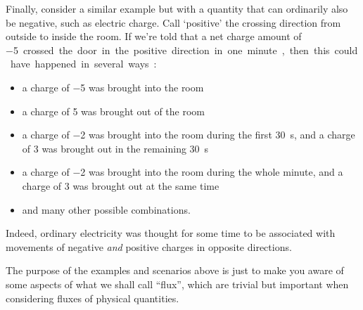 \documentclass[a4paper,12pt,%
onecolumn,oneside,titlepage,%
british%
]{memoir}
\renewcommand*{\|}[1][]{\nonscript\:#1\vert\nonscript\:\mathopen{}}
\begin{document}
Finally, consider a similar example but with a quantity that can ordinarily also be negative, such as electric charge. Call \enquote*{positive} the crossing direction from outside to inside the room. If we're told that a net charge amount of \qty{-5} crossed the door in the positive direction in one minute, then this could have happened in several ways:
\begin{itemize}\tightlist
\item a charge of \num{-5} was brought into the room
\item a charge of \num{+5} was brought out of the room
\item a charge of \num{-2} was brought into the room during the first \qty{30}{s}, and a charge of \num{+3} was brought out in the remaining \qty{30}{s}
\item a charge of \num{-2} was brought into the room during the whole minute, and a charge of \num{+3} was brought out at the same time
\item \textellipsis and many other possible combinations.
\end{itemize}
%
Indeed, ordinary electricity was  thought for some time to be associated with movements of negative \emph{and} positive charges in opposite directions.

\smallskip

The purpose of the examples and scenarios above is just to make you aware of some  aspects of what we shall call \enquote{flux}, which are trivial but important when considering fluxes of physical quantities.
\end{document}
